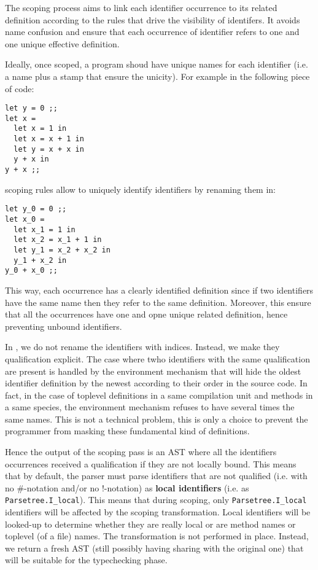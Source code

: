 The scoping process aims to link each identifier occurrence to its
related definition according to the rules that drive the visibility of
identifers. It avoids name confusion and ensure that each occurrence
of identifier refers to one and one unique effective definition.

Ideally, once scoped, a program shoud have unique names for each
identifier (i.e. a name plus a stamp that ensure the unicity). For
example in the following piece of code:
{\footnotesize
\begin{lstlisting}
let y = 0 ;;
let x =
  let x = 1 in
  let x = x + 1 in
  let y = x + x in
  y + x in
y + x ;;
\end{lstlisting}
}
scoping rules allow to uniquely identify identifiers by renaming them
in:
{\footnotesize
\begin{lstlisting}
let y_0 = 0 ;;
let x_0 =
  let x_1 = 1 in
  let x_2 = x_1 + 1 in
  let y_1 = x_2 + x_2 in
  y_1 + x_2 in
y_0 + x_0 ;;
\end{lstlisting}
}

This way, each occurrence has a clearly identified definition since if
two identifiers have the same name then they refer to the same
definition. Moreover, this ensure that all the occurrences have one
and opne unique related definition, hence preventing unbound
identifiers.

In \focalize, we do not rename the identifiers with indices. Instead,
we make they qualification explicit. The case where twho identifiers
with the same qualification are present is handled by the environment
mechanism that will hide the oldest identifier definition by the
newest according to their order in the source code. In fact, in the
case of toplevel definitions in a same compilation unit and methods in
a same species, the environment mechanism refuses to have several
times the same names. This is not a technical problem, this is only a
choice to prevent the programmer from masking these fundamental kind
of definitions.

Hence the output of the scoping pass is an AST where all the
identifiers occurrences received a qualification if they are not
locally bound. This means that by default, the parser must parse
identifiers that are not qualified (i.e. with no \#-notation and/or no
!-notation) as {\bf local identifiers} (i.e. as
{\tt Parsetree.I\_local}). This means that during scoping, only
{\tt Parsetree.I\_local} identifiers will be affected by the scoping
transformation. Local identifiers will be looked-up to determine
whether they are really local or are method names or toplevel (of a
file) names. The transformation is not performed in place. Instead, we
return a fresh AST (still possibly having sharing with the original
one) that will be suitable for the typechecking phase.

